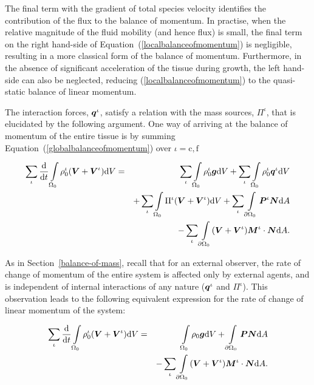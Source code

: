 The final term with the gradient of total species velocity identifies
the contribution of the flux to the balance of momentum. In practise,
when the relative magnitude of the fluid mobility (and hence flux) is
small, the final term on the right hand-side of
Equation~(\ref{localbalanceofmomentum}) is negligible, resulting in a
more classical form of the balance of momentum. Furthermore, in the
absence of significant acceleration of the tissue during growth, the
left hand-side can also be neglected, reducing
(\ref{localbalanceofmomentum}) to the quasi-static balance of linear
momentum.

The interaction forces, $\mbox{\boldmath$ q$}^\iota$, satisfy a relation with the mass
sources, $\Pi^\iota$, that is elucidated by the following
argument. One way of arriving at the balance of momentum of the entire
tissue is by summing Equation~(\ref{globalbalanceofmomentum}) over
$\iota = \mathrm{c,f}$

\begin{eqnarray}
\sum\limits_{\iota}\frac{\mathrm{d}}{\mathrm{d}t}
\int\limits_{\Omega_0} \rho_0^\iota(\mbox{\boldmath$ V$}+\mbox{\boldmath$ V$}^\iota) \mathrm{d}V &=&
\sum\limits_{\iota}\int\limits_{\Omega_0} \rho^\iota_0\mbox{\boldmath$ g$} \mathrm{d}V
+ \sum\limits_{\iota}\int\limits_{\Omega_0} \rho^\iota_0\mbox{\boldmath$ q$}^\iota
\mathrm{d}V\nonumber\\& & + \sum\limits_{\iota}\int\limits_{\Omega_0}
\Pi^\iota(\mbox{\boldmath$ V$}+\mbox{\boldmath$ V$}^\iota) \mathrm{d}V + \sum\limits_{\iota}
\int\limits_{\partial \Omega_0}\mbox{\boldmath$ P$}^\iota\mbox{\boldmath$ N$} \mathrm{d}A\nonumber\\ & &
- \sum\limits_{\iota}\int\limits_{\partial
  \Omega_0}(\mbox{\boldmath$ V$}+\mbox{\boldmath$ V$}^\iota)\mbox{\boldmath$ M$}^\iota\cdot\mbox{\boldmath$ N$} \mathrm{d}A.
\label{momentumsummation}
\end{eqnarray}

As in Section~\ref{balance-of-mass}, recall that for an external
observer, the rate of change of momentum of the entire system is
affected only by external agents, and is independent of internal
interactions of any nature ($\mbox{\boldmath$ q$}^\iota$ and $\Pi^\iota$). This
observation leads to the following equivalent expression for the rate
of change of linear momentum of the system:

\begin{eqnarray}
\sum\limits_{\iota}\frac{\mathrm{d}}{\mathrm{d}t}
\int\limits_{\Omega_0} \rho_0^\iota(\mbox{\boldmath$ V$}+\mbox{\boldmath$ V$}^\iota) \mathrm{d}V &=&
\int\limits_{\Omega_0}\rho_0\mbox{\boldmath$ g$} \mathrm{d}V + \int\limits_{\partial
  \Omega_0}\mbox{\boldmath$ P$}\mbox{\boldmath$ N$} \mathrm{d}A \nonumber\\ & &-
\sum\limits_{\iota}\int\limits_{\partial
  \Omega_0}(\mbox{\boldmath$ V$}+\mbox{\boldmath$ V$}^\iota)\mbox{\boldmath$ M$}^\iota\cdot\mbox{\boldmath$ N$} \mathrm{d}A.
\label{momentumexternal}
\end{eqnarray}

